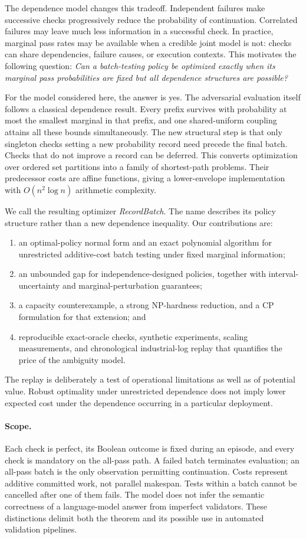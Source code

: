\documentclass[runningheads]{llncs}
\begin{document}
The dependence model changes this tradeoff. Independent failures make
successive checks progressively reduce the probability of continuation.
Correlated failures may leave much less information in a successful check.
In practice, marginal pass rates may be available when a credible joint model
is not: checks can share dependencies, failure causes, or execution contexts.
This motivates the following question:
\emph{Can a batch-testing policy be optimized exactly when its marginal pass
probabilities are fixed but all dependence structures are possible?}

For the model considered here, the answer is yes. The adversarial evaluation
itself follows a classical dependence result. Every prefix survives with
probability at most the smallest marginal in that prefix, and one shared-uniform
coupling attains all these bounds simultaneously. The new structural step is
that only singleton checks setting a new probability record need precede the
final batch. Checks that do not improve a record can be deferred. This converts
optimization over ordered set partitions into a family of shortest-path
problems. Their predecessor costs are affine functions, giving a lower-envelope
implementation with $O(n^2\log n)$ arithmetic complexity.

We call the resulting optimizer \emph{RecordBatch}. The name describes its policy
structure rather than a new dependence inequality. Our contributions are:
\begin{enumerate}
\item an optimal-policy normal form and an exact polynomial algorithm for
unrestricted additive-cost batch testing under fixed marginal information;
\item an unbounded gap for independence-designed policies, together with
interval-uncertainty and marginal-perturbation guarantees;
\item a capacity counterexample, a strong NP-hardness reduction, and a
CP formulation for that extension; and
\item reproducible exact-oracle checks, synthetic experiments, scaling
measurements, and chronological industrial-log replay that quantifies the
price of the ambiguity model.
\end{enumerate}
The replay is deliberately a test of operational limitations as well as of
potential value. Robust optimality under unrestricted dependence does not
imply lower expected cost under the dependence occurring in a particular
deployment.

\paragraph{Scope.}
Each check is perfect, its Boolean outcome is fixed during an episode, and
every check is mandatory on the all-pass path. A failed batch terminates
evaluation; an all-pass batch is the only observation permitting continuation.
Costs represent additive committed work, not parallel makespan. Tests within
a batch cannot be cancelled after one of them fails. The model does not infer
the semantic correctness of a language-model answer from imperfect validators.
These distinctions delimit both the theorem and its possible use in automated
validation pipelines.
\end{document}
